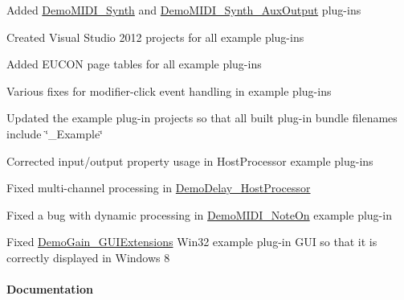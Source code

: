 \begin{DoxyItemize}
\item Added \hyperlink{a00376_DemoMIDI_Synth}{Demo\+M\+I\+D\+I\+\_\+\+Synth} and \hyperlink{a00376_DemoMIDI_Synth_AuxOutput}{Demo\+M\+I\+D\+I\+\_\+\+Synth\+\_\+\+Aux\+Output} plug-\/ins 
\item Created Visual Studio 2012 projects for all example plug-\/ins 
\item Added E\+U\+C\+O\+N page tables for all example plug-\/ins 
\item Various fixes for modifier-\/click event handling in example plug-\/ins 
\item Updated the example plug-\/in projects so that all built plug-\/in bundle filenames include \char`\"{}\+\_\+\+Example\char`\"{} 
\item Corrected input/output property usage in Host\+Processor example plug-\/ins 
\item Fixed multi-\/channel processing in \hyperlink{a00376_DemoDelay_HostProcessor}{Demo\+Delay\+\_\+\+Host\+Processor} 
\item Fixed a bug with dynamic processing in \hyperlink{a00376_DemoMIDI_NoteOn}{Demo\+M\+I\+D\+I\+\_\+\+Note\+On} example plug-\/in 
\item Fixed \hyperlink{a00376_DemoGain_GUIExtensions}{Demo\+Gain\+\_\+\+G\+U\+I\+Extensions} Win32 example plug-\/in G\+U\+I so that it is correctly displayed in Windows 8 
\end{DoxyItemize}\hypertarget{a00375_aax_sdk_2p2p0_Documentation}{}\paragraph{Documentation}\label{a00375_aax_sdk_2p2p0_Documentation}

